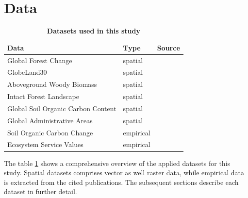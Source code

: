 \section{Data}
\label{sec:data}
	\begin{table}[ht]
		\centering
		\caption[Datasets used in this study]{\textbf{Datasets used in this study}}
		\label{tab:datasets}
		\begin{tabular}{lll}
			\hline
			Data & Type & Source \\\hline
			Global Forest Change & spatial & \citet{Hansen2013} \\
			GlobeLand30 & spatial & \citet{Chen2015} \\
			Aboveground Woody Biomass & spatial & \citet{Baccini2015} \\
			Intact Forest Landscape & spatial & \citet{Potapov2017} \\
			Global Soil Organic Carbon Content & spatial & \citet{FAO2018} \\
			Global Administrative Areas & spatial & \citet{Hijmans2018} \\
			Soil Organic Carbon Change & empirical & \citet{Don2010} \\
			\multirow{3}{*}{Ecosystem Service Values} & \multirow{3}{*}{empirical} & \citet{Costanza2014} \\
			&& \citet{Groot2012} \\
			&& \citet{Siikamaki2015} \\\hline
		\end{tabular}
	\end{table}
	The table \ref{tab:datasets} shows a comprehensive overview of the applied datasets for this study. Spatial datasets comprises vector as well raster data, while empirical data is extracted from the cited publications. The subsequent sections describe each dataset in further detail.

